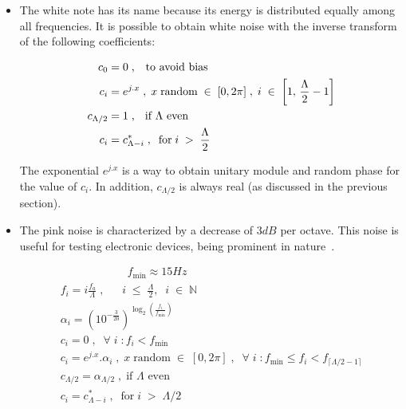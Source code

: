 \begin{itemize}

 \item The white note has its name because its energy is distributed equally among all frequencies. It is possible to obtain white noise with the inverse transform of the following coefficients:

\begin{equation}\label{eq:branco}
 \begin{split}
 c_0 & =0 \;\text{,\quad to avoid bias} \\
 c_i & =e^{j.x}\;,\; x \; \text{random} \; \in \; [0,2\pi]\;,\; i \; \in \; \left[1, \, \frac{\Lambda}{2}-1\right] \\
 c_{\Lambda/2} & = 1 \; \text{, \; if $\Lambda$ even}\\ 
 c_i & = c_{\Lambda - i}^*\;,\;\; \text{for}\;  i \; > \;  \frac{\Lambda}{2}
 \end{split}
\end{equation}

The exponential $e^{j.x}$ is a way to obtain unitary module and random phase for the value of $c_i$. In addition, $c_{\Lambda/2}$ is always real (as discussed in the previous section).

 \item The pink noise is characterized by a decrease of $3dB$ per octave. This noise is useful for testing electronic devices, being prominent in nature~\cite{Roederer}. 

\begin{multline}\label{eq:rosa}
 \qquad \qquad \qquad f_{\text{min}}  \approx 15 Hz \\
 f_i  = i \frac{f_a}{\Lambda} \;, \;\; \quad i \;\leq\; \frac{\Lambda}{2},\;\; i\;\in\;\mathbb{N}  \\
 \alpha_i  = \left(10^{-\frac{3}{20}}\right)^{\log _2 \left ( \frac{f_i}{f_{\text{min}}} \right )}  \\
 c_i  =0\;,\;\; \forall \; i \; : f_i<f_{\text{min}} \\
 c_i  =e^{j.x} . \alpha_i\;, \; x \; \text{random} \; \in \; [0,2\pi]\;,\;\; \forall \; i \; : f_{\text{min}} \le f_i < f_{\lceil \Lambda/2-1 \rceil}  \\
 c_{\Lambda/2}  = \alpha_{\Lambda/2}\;, \; \text{if $\Lambda$ even} \\ 
 c_i  = c_{\Lambda - i}^*\;,\;\; \text{for}\;  i \; > \;  \Lambda/2 \qquad \qquad
\end{multline}
 


\end{itemize}
